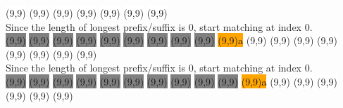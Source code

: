 \begin{center}
  \colorbox{white}{\makebox(9,9){\textcolor{black}{}}}
  \colorbox{white}{\makebox(9,9){\textcolor{black}{}}}
  \colorbox{white}{\makebox(9,9){\textcolor{black}{}}}
  \colorbox{white}{\makebox(9,9){\textcolor{black}{}}}
  \colorbox{white}{\makebox(9,9){\textcolor{black}{}}}
  \colorbox{white}{\makebox(9,9){\textcolor{black}{}}}
  \colorbox{white}{\makebox(9,9){\textcolor{black}{}}}
  \\
  Since the length of longest prefix/suffix is 0, start matching at index 0.
  \\
  \colorbox{gray}{\makebox(9,9){\textcolor{black}{}}}
  \colorbox{gray}{\makebox(9,9){\textcolor{black}{}}}
  \colorbox{gray}{\makebox(9,9){\textcolor{black}{}}}
  \colorbox{gray}{\makebox(9,9){\textcolor{black}{}}}
  \colorbox{gray}{\makebox(9,9){\textcolor{black}{}}}
  \colorbox{gray}{\makebox(9,9){\textcolor{black}{}}}
  \colorbox{gray}{\makebox(9,9){\textcolor{black}{}}}
  \colorbox{gray}{\makebox(9,9){\textcolor{black}{}}}
  \colorbox{gray}{\makebox(9,9){\textcolor{black}{}}}
  \colorbox{orange}{\makebox(9,9){\textcolor{black}{a}}}
  \colorbox{white}{\makebox(9,9){\textcolor{black}{}}}
  \colorbox{white}{\makebox(9,9){\textcolor{black}{}}}
  \colorbox{white}{\makebox(9,9){\textcolor{black}{}}}
  \colorbox{white}{\makebox(9,9){\textcolor{black}{}}}
  \colorbox{white}{\makebox(9,9){\textcolor{black}{}}}
  \colorbox{white}{\makebox(9,9){\textcolor{black}{}}}
  \colorbox{white}{\makebox(9,9){\textcolor{black}{}}}
  \colorbox{white}{\makebox(9,9){\textcolor{black}{}}}
  \\
  Since the length of longest prefix/suffix is 0, start matching at index 0.
  \\
  \colorbox{gray}{\makebox(9,9){\textcolor{black}{}}}
  \colorbox{gray}{\makebox(9,9){\textcolor{black}{}}}
  \colorbox{gray}{\makebox(9,9){\textcolor{black}{}}}
  \colorbox{gray}{\makebox(9,9){\textcolor{black}{}}}
  \colorbox{gray}{\makebox(9,9){\textcolor{black}{}}}
  \colorbox{gray}{\makebox(9,9){\textcolor{black}{}}}
  \colorbox{gray}{\makebox(9,9){\textcolor{black}{}}}
  \colorbox{gray}{\makebox(9,9){\textcolor{black}{}}}
  \colorbox{gray}{\makebox(9,9){\textcolor{black}{}}}
  \colorbox{gray}{\makebox(9,9){\textcolor{black}{}}}
  \colorbox{orange}{\makebox(9,9){\textcolor{black}{a}}}
  \colorbox{white}{\makebox(9,9){\textcolor{black}{}}}
  \colorbox{white}{\makebox(9,9){\textcolor{black}{}}}
  \colorbox{white}{\makebox(9,9){\textcolor{black}{}}}
  \colorbox{white}{\makebox(9,9){\textcolor{black}{}}}
  \colorbox{white}{\makebox(9,9){\textcolor{black}{}}}
  \colorbox{white}{\makebox(9,9){\textcolor{black}{}}}

\end{center}
